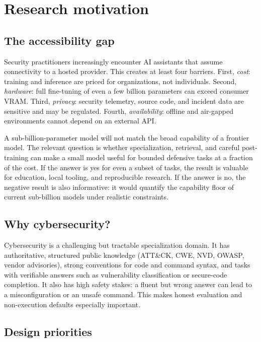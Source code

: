 \section{Research motivation}
\label{sec:motivation}

\subsection{The accessibility gap}

Security practitioners increasingly encounter AI assistants that assume
connectivity to a hosted provider. This creates at least four barriers. First,
\emph{cost}: training and inference are priced for organizations, not
individuals. Second, \emph{hardware}: full fine-tuning of even a few billion
parameters can exceed consumer VRAM. Third, \emph{privacy}: security telemetry,
source code, and incident data are sensitive and may be regulated. Fourth,
\emph{availability}: offline and air-gapped environments cannot depend on an
external API.

A sub-billion-parameter model will not match the broad capability of a
frontier model. The relevant question is whether specialization, retrieval, and
careful post-training can make a small model useful for bounded defensive tasks
at a fraction of the cost. If the answer is yes for even a subset of tasks, the
result is valuable for education, local tooling, and reproducible research. If
the answer is no, the negative result is also informative: it would quantify the
capability floor of current sub-billion models under realistic constraints.

\subsection{Why cybersecurity?}

Cybersecurity is a challenging but tractable specialization domain. It has
authoritative, structured public knowledge (ATT\&CK, CWE, NVD, OWASP, vendor
advisories), strong conventions for code and command syntax, and tasks with
verifiable answers such as vulnerability classification or secure-code
completion. It also has high safety stakes: a fluent but wrong answer can lead
to a misconfiguration or an unsafe command. This makes honest evaluation and
non-execution defaults especially important.

\subsection{Design priorities}

